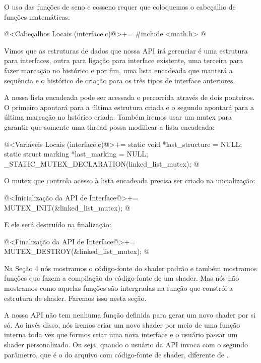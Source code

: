 O uso das funções de seno e cosseno requer que coloquemos o cabeçalho
de funções matemáticas:

\iniciocodigo
@<Cabeçalhos Locais (interface.c)@>+=
#include <math.h>
@
\fimcodigo


Vimos que as estruturas de dados que nossa API irá gerenciar é uma
estrutura para interfaces, outra para ligação para interface
existente, uma terceira para fazer marcação no histórico e por fim,
uma lista encadeada que manterá a sequência e o histórico de criação
para os três tipos de interface anteriores.

A nossa lista encadeada pode ser acessada e percorrida através de dois
ponteiros. O primeiro apontará para a última estrutura criada e o
segundo apontará para a última marcação no hstórico criada. Também
iremos usar um mutex para garantir que somente uma thread possa
modificar a lista encadeada:

\iniciocodigo
@<Variáveis Locais (interface.c)@>+=
static void *last_structure = NULL;
static struct marking *last_marking = NULL;
_STATIC_MUTEX_DECLARATION(linked_list_mutex);
@
\fimcodigo

O mutex que controla acesso à lista encadeada precisa ser criado na
inicialização:

\iniciocodigo
@<Inicialização da API de Interface@>+=
MUTEX_INIT(&linked_list_mutex);
@
\fimcodigo

E ele será destruído na finalização:

\iniciocodigo
@<Finalização da API de Interface@>+=
MUTEX_DESTROY(&linked_list_mutex);
@
\fimcodigo


Na Seção 4 nós mostramos o código-fonte do shader padrão e também
mostramos funções que fazem a compilação do código-fonte de um
shader. Mas nós não mostramos como aquelas funções são intergradas na
função que constrói a estrutura de shader. Faremos isso nesta seção.

A nossa API não tem nenhuma função definida para gerar um novo shader
por si só. Ao invés disso, nós iremos criar um novo shader por meio de
uma função interna toda vez que formos criar uma nova interface e o
usuário passar um shader personalizado. Ou seja, quando o usuário da
API invoca  com o segundo parâmetro, que
é o do arquivo com código-fonte de shader, diferente
de .

